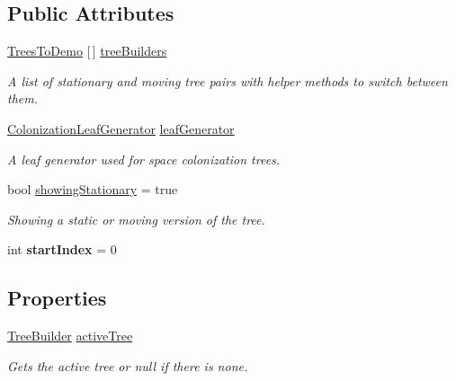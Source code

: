 \subsection*{Public Attributes}
\begin{DoxyCompactItemize}
\item 
\hyperlink{class_fractal_tree_1_1_demo_1_1_trees_to_demo}{Trees\+To\+Demo} \mbox{[}$\,$\mbox{]} \hyperlink{class_fractal_tree_1_1_demo_1_1_demo_tree_creator_a467fca64d8fc1098bc4684bd9987850c}{tree\+Builders}
\begin{DoxyCompactList}\small\item\em A list of stationary and moving tree pairs with helper methods to switch between them. \end{DoxyCompactList}\item 
\hyperlink{class_fractal_tree_1_1_colonization_leaf_generator}{Colonization\+Leaf\+Generator} \hyperlink{class_fractal_tree_1_1_demo_1_1_demo_tree_creator_aa359c2bdf8c008848518f4c67cb5df53}{leaf\+Generator}
\begin{DoxyCompactList}\small\item\em A leaf generator used for space colonization trees. \end{DoxyCompactList}\item 
bool \hyperlink{class_fractal_tree_1_1_demo_1_1_demo_tree_creator_a17a43b81fc0033481925e700fc2011f4}{showing\+Stationary} = true
\begin{DoxyCompactList}\small\item\em Showing a static or moving version of the tree. \end{DoxyCompactList}\item 
\mbox{\label{class_fractal_tree_1_1_demo_1_1_demo_tree_creator_afcb3eaaf09e36ee8030025eca5d31888}} 
int {\bfseries start\+Index} = 0
\end{DoxyCompactItemize}
\subsection*{Properties}
\begin{DoxyCompactItemize}
\item 
\hyperlink{class_fractal_tree_1_1_tree_builder}{Tree\+Builder} \hyperlink{class_fractal_tree_1_1_demo_1_1_demo_tree_creator_a67e1b37c9ecc60e628533b069c3c0d98}{active\+Tree}
\begin{DoxyCompactList}\small\item\em Gets the active tree or null if there is none. \end{DoxyCompactList}\end{DoxyCompactItemize}


